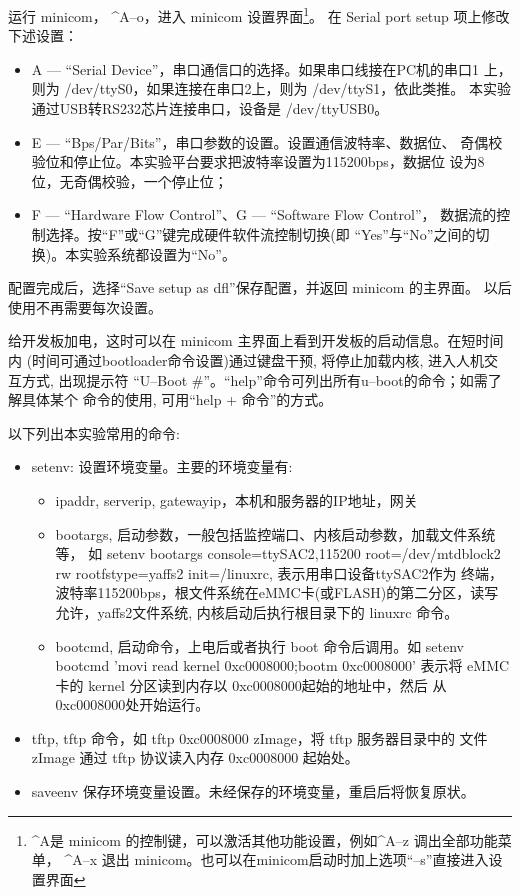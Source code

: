     运行 minicom， \^{}A--o，进入 minicom 设置界面\footnote{\^{}A是
minicom 的控制键，可以激活其他功能设置，例如\^{}A--z 调出全部功能菜单，
\^{}A--x 退出 minicom。也可以在minicom启动时加上选项``--s''直接进入设置界面}。
在 Serial port setup 项上修改下述设置：
\begin{itemize}\itemsep=-3pt
  \item A --- ``Serial Device''，串口通信口的选择。如果串口线接在PC机的串口1
		上，则为 /dev/ttyS0，如果连接在串口2上，则为 /dev/ttyS1，依此类推。
		本实验通过USB转RS232芯片连接串口，设备是 /dev/ttyUSB0。
  \item E --- ``Bps/Par/Bits''，串口参数的设置。设置通信波特率、数据位、
		奇偶校验位和停止位。本实验平台要求把波特率设置为115200bps，数据位
		设为8位，无奇偶校验，一个停止位；
  \item F --- ``Hardware Flow Control''、G --- ``Software Flow Control''，
		数据流的控制选择。按``F''或``G''键完成硬件软件流控制切换(即
		``Yes''与``No''之间的切换)。本实验系统都设置为``No''。
\end{itemize}

	配置完成后，选择``Save setup as dfl''保存配置，并返回 minicom 的主界面。
以后使用不再需要每次设置。

	给开发板加电，这时可以在 minicom 主界面上看到开发板的启动信息。在短时间内
(时间可通过bootloader命令设置)通过键盘干预, 将停止加载内核, 进入人机交互方式,
出现提示符 ``U--Boot \#''。``help''命令可列出所有u--boot的命令；如需了解具体某个
命令的使用, 可用``help + 命令''的方式。

	以下列出本实验常用的命令:
\begin{itemize}
  \item setenv: 设置环境变量。主要的环境变量有:
  \begin{itemize}
    \item ipaddr, serverip, gatewayip，本机和服务器的IP地址，网关
    \item bootargs, 启动参数，一般包括监控端口、内核启动参数，加载文件系统等，
		如 setenv bootargs console=ttySAC2,115200 root=/dev/mtdblock2 rw
             rootfstype=yaffs2 init=/linuxrc, 表示用串口设备ttySAC2作为
		终端，波特率115200bps，根文件系统在eMMC卡(或FLASH)的第二分区，读写
		允许，yaffs2文件系统, 内核启动后执行根目录下的 linuxrc 命令。
	\item bootcmd, 启动命令，上电后或者执行 boot 命令后调用。如
		setenv bootcmd 'movi read kernel 0xc0008000;bootm 0xc0008000'
		表示将 eMMC 卡的 kernel 分区读到内存以 0xc0008000起始的地址中，然后
		从0xc0008000处开始运行。
  \end{itemize}
  \item tftp, tftp 命令，如 tftp 0xc0008000 zImage，将 tftp 服务器目录中的
        文件 zImage 通过 tftp 协议读入内存 0xc0008000 起始处。
  \item saveenv 保存环境变量设置。未经保存的环境变量，重启后将恢复原状。
\end{itemize}



